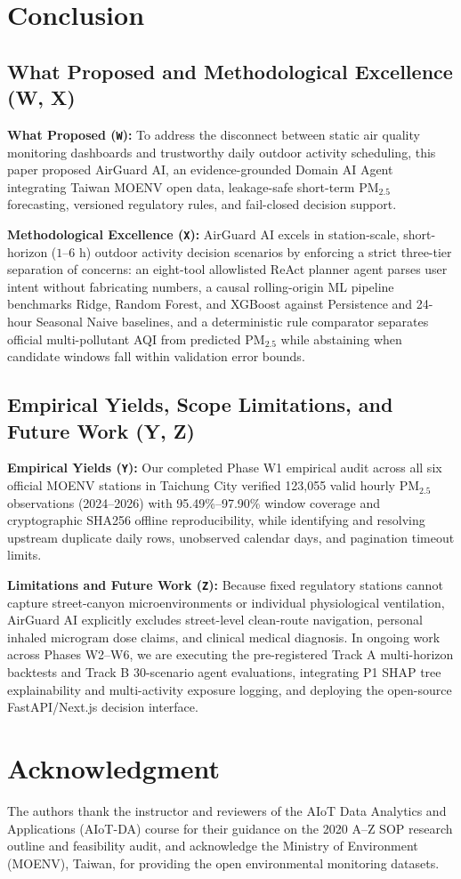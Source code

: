 \section{Conclusion}

\subsection{What Proposed and Methodological Excellence (W, X)}
\textbf{What Proposed (\texttt{W}):} To address the disconnect between static air quality monitoring dashboards and trustworthy daily outdoor activity scheduling, this paper proposed AirGuard AI, an evidence-grounded Domain AI Agent integrating Taiwan MOENV open data, leakage-safe short-term $\text{PM}_{2.5}$ forecasting, versioned regulatory rules, and fail-closed decision support.

\textbf{Methodological Excellence (\texttt{X}):} AirGuard AI excels in station-scale, short-horizon ($1\text{--}6\text{ h}$) outdoor activity decision scenarios by enforcing a strict three-tier separation of concerns: an eight-tool allowlisted ReAct planner agent parses user intent without fabricating numbers, a causal rolling-origin ML pipeline benchmarks Ridge, Random Forest, and XGBoost against Persistence and 24-hour Seasonal Naive baselines, and a deterministic rule comparator separates official multi-pollutant AQI from predicted $\text{PM}_{2.5}$ while abstaining when candidate windows fall within validation error bounds.

\subsection{Empirical Yields, Scope Limitations, and Future Work (Y, Z)}
\textbf{Empirical Yields (\texttt{Y}):} Our completed Phase W1 empirical audit across all six official MOENV stations in Taichung City verified 123,055 valid hourly $\text{PM}_{2.5}$ observations (2024--2026) with 95.49\%--97.90\% window coverage and cryptographic SHA256 offline reproducibility, while identifying and resolving upstream duplicate daily rows, unobserved calendar days, and pagination timeout limits.

\textbf{Limitations and Future Work (\texttt{Z}):} Because fixed regulatory stations cannot capture street-canyon microenvironments or individual physiological ventilation, AirGuard AI explicitly excludes street-level clean-route navigation, personal inhaled microgram dose claims, and clinical medical diagnosis. In ongoing work across Phases W2--W6, we are executing the pre-registered Track A multi-horizon backtests and Track B 30-scenario agent evaluations, integrating P1 SHAP tree explainability and multi-activity exposure logging, and deploying the open-source FastAPI/Next.js decision interface.

\section*{Acknowledgment}
The authors thank the instructor and reviewers of the AIoT Data Analytics and Applications (AIoT-DA) course for their guidance on the 2020 A--Z SOP research outline and feasibility audit, and acknowledge the Ministry of Environment (MOENV), Taiwan, for providing the open environmental monitoring datasets.
